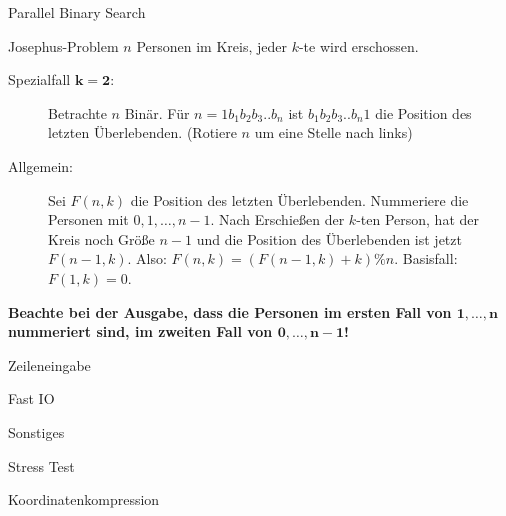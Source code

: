 \begin{algorithm}{Parallel Binary Search}
\end{algorithm}

\begin{algorithm}{Josephus-Problem}
	$n$ Personen im Kreis, jeder $k$-te wird erschossen.
	\begin{description}
		\item[Spezialfall $\boldsymbol{k=2}$:] Betrachte $n$ Binär.
		Für $n = 1b_1b_2b_3..b_n$ ist $b_1b_2b_3..b_n1$ die Position des letzten Überlebenden.
		(Rotiere $n$ um eine Stelle nach links)
	\end{description}
	
	\begin{description}
		\item[Allgemein:] Sei $F(n,k)$ die Position des letzten Überlebenden.
		Nummeriere die Personen mit $0, 1, \ldots, n-1$.
		Nach Erschießen der $k$-ten Person, hat der Kreis noch Größe $n-1$ und die Position des Überlebenden ist jetzt $F(n-1,k)$.
		Also: $F(n,k) = (F(n-1,k)+k)\%n$. Basisfall: $F(1,k) = 0$.
	\end{description}
	\textbf{Beachte bei der Ausgabe, dass die Personen im ersten Fall von $\boldsymbol{1, \ldots, n}$ nummeriert sind, im zweiten Fall von $\boldsymbol{0, \ldots, n-1}$!}
\end{algorithm}

\begin{algorithm}[optional]{Zeileneingabe}
\end{algorithm}

\begin{algorithm}[optional]{Fast IO}
\end{algorithm}

\begin{algorithm}{Sonstiges}
\end{algorithm}

\begin{algorithm}{Stress Test}
\end{algorithm}

\begin{algorithm}{Koordinatenkompression}
\end{algorithm}

